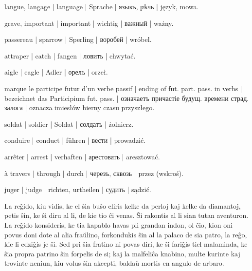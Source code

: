 \begin{ekzvocab}{1em}
 langue, langage | language | Sprache | языкъ, рѣчь | język, mowa.

 grave, important | important | wichtig | важный | ważny.

 passereau | sparrow | Sperling | воробей | wróbel.

 attraper | catch | fangen | ловить | chwytać.

 aigle | eagle | Adler | орелъ | orzeł.

 marque le participe futur d’un verbe passif | ending of fut. part. pass. in verbs | bezeichnet das Participium fut. pass. | означаетъ причастіе будущ. времени страд. залога | oznacza imiesłów bierny czasu przyszłego.

 soldat | soldier | Soldat | солдатъ | żolnierz.

 conduire | conduct | führen | вести | prowadzić.

 arrêter | arrest | verhaften | арестовать | aresztować.

 à travers | through | durch | черезъ, сквозь | przez (wskroś).

 juger | judge | richten, urtheilen | судить | sądzić.

\end{ekzvocab}

\begin{samepage}

La reĝido, kiu vidis, ke el ŝia buŝo eliris kelke da perloj kaj kelke da diamantoj, petis ŝin, ke ŝi diru al li, de kie tio ĉi venas. Ŝi rakontis al li sian tutan aventuron. La reĝido konsideris, ke tia kapablo havas pli grandan indon, ol ĉio, kion oni povus doni dote al alia fraŭlino, forkondukis ŝin al la palaco de sia patro, la reĝo, kie li edziĝis je ŝi. Sed pri ŝia fratino ni povas diri, ke ŝi fariĝis tiel malaminda, ke ŝia propra patrino ŝin forpelis de si; kaj la malfeliĉa knabino, multe kurinte kaj trovinte neniun, kiu volus ŝin akcepti, baldaŭ mortis en angulo de arbaro.
\end{samepage}

